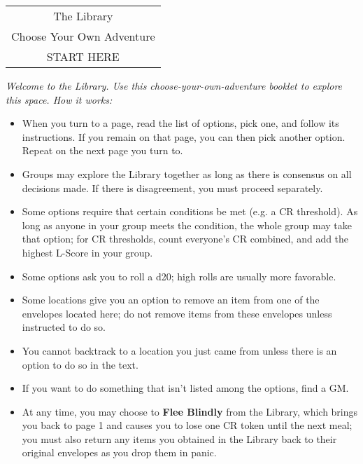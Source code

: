 \documentclass[sheet]{GL2020}
\begin{document}
\begin{center}\LARGE\bf\begin{tabular}{|c|}
  \hline The Library\\ Choose Your Own Adventure\\ START HERE\\ \hline
\end{tabular}\end{center}

\begingroup
\itshape
Welcome to the Library. Use this choose-your-own-adventure booklet to explore this space. How it works:
\begin{itemize}
  \item When you turn to a page, read the list of options, pick one, and follow its instructions. If you remain on that page, you can then pick another option. Repeat on the next page you turn to.
  \item Groups may explore the Library together as long as there is consensus on all decisions made. If there is disagreement, you must proceed separately.
  \item Some options require that certain conditions be met (e.g. a CR threshold). As long as anyone in your group meets the condition, the whole group may take that option; for CR thresholds, count everyone’s CR combined, and add the highest L-Score in your group. 
  \item Some options ask you to roll a d20; high rolls are usually more favorable. 
  \item Some locations give you an option to remove an item from one of the envelopes located here; do not remove items from these envelopes unless instructed to do so. 
  \item You cannot backtrack to a location you just came from unless there is an option to do so in the text. 
  \item If you want to do something that isn’t listed among the options, find a GM. 
  \item At any time, you may choose to \textbf{Flee Blindly} from the Library, which brings you back to page 1 and causes you to lose one CR token until the next meal; you must also return any items you obtained in the Library back to their original envelopes as you drop them in panic.
\end{itemize}
\endgroup
\end{document}
